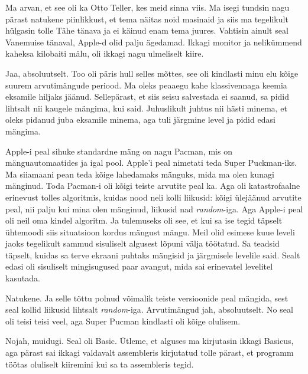Ma arvan, et see oli ka Otto Teller, kes meid sinna viis. Ma isegi tundsin nagu 
pärast natukene piinlikkust, et tema näitas noid masinaid ja siis ma tegelikult 
hülgasin tolle Tähe tänava ja ei käinud enam tema juures. Vahtisin ainult seal 
Vanemuise tänaval, Apple-d olid palju  ägedamad. Ikkagi monitor ja nelikümmend 
kaheksa kilobaiti mälu, oli ikkagi nagu ulmeliselt kiire.


Jaa,  absoluutselt. Too oli päris hull selles mõttes, see oli kindlasti minu 
elu kõige suurem arvutimängude periood. Ma oleks peaaegu kahe klassivennaga 
keemia eksamile hiljaks jäänud. Sellepärast, et siis seisu salvestada  ei 
saanud, sa pidid lihtsalt nii kaugele mängima, kui said. Juhuslikult juhtus 
nii hästi minema, et oleks pidanud juba eksamile minema, aga tuli järgmine 
level ja pidid edasi mängima.


Apple-i peal sihuke standardne mäng on nagu Pacman, mis on mänguautomaatides ja 
igal pool. Apple'i peal nimetati teda Super Puckman-iks. Ma siiamaani pean teda kõige lahedamaks mänguks, mida ma olen kunagi 
mänginud. Toda Pacman-i oli kõigi teiste arvutite peal ka. Aga 
  oli  katastrofaalne  erinevust tolles algoritmis, kuidas nood 
neli kolli liikusid: kõigi ülejäänud arvutite peal, nii palju kui mina olen 
mänginud, liikusid nad \emph{random}-iga. Aga Apple-i peal oli neil oma kindel 
algoritm. Ja tulemuseks oli see, et kui sa ise tegid täpselt ühtemoodi siis 
situatsioon kordus mängust mängu. Meil olid esimese kuue 
leveli jaoks tegelikult sammud sisuliselt algusest lõpuni välja töötatud. Sa 
teadsid täpselt, 
kuidas sa terve ekraani puhtaks mängisid ja järgmisele levelile said. 
Sealt edasi oli sisuliselt mingisugused paar avangut, mida sai erinevatel 
levelitel kasutada.


Natukene. Ja selle tõttu polnud võimalik teiste versioonide peal mängida, sest 
seal kollid liikusid lihtsalt  \emph{random}-iga. Arvutimängud jah, 
absoluutselt. No seal oli teisi teisi veel, aga Super Pucman kindlasti oli 
kõige olulisem.


Nojah, muidugi. Seal oli Basic. Ütleme, et alguses ma 
kirjutasin ikkagi Basicus, aga pärast sai ikkagi valdavalt 
assembleris kirjutatud tolle pärast, et programm töötas 
oluliselt kiiremini kui sa ta assembleris tegid. 

